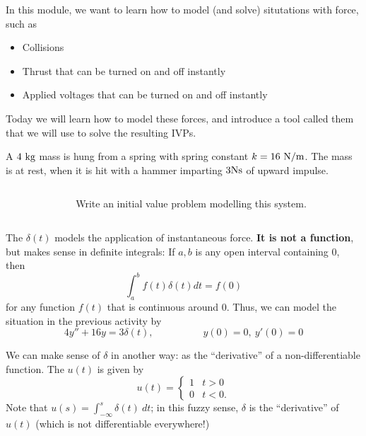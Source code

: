 \begin{applicationActivities}

\begin{observation}
In this module, we want to learn how to model (and solve) situtations with  force, such as
\begin{itemize}
	\item Collisions
	\item Thrust that can be turned on and off instantly
	\item Applied voltages that can be turned on and off instantly
\end{itemize}
\vfill
Today we will learn how to model these forces, and introduce a tool called them  that we will use to solve the resulting IVPs.
\end{observation}


\begin{activity}{5}
A \(4\ {\rm kg}\) mass is hung from a spring with spring constant \(k=16\ {\rm N/m}\).  The mass is at rest, when it is hit with a hammer imparting \(3 {\rm N s}\) of upward impulse.
\vfill
\begin{columns}
\begin{column}{0.3\textwidth}
\begin{center}
\springmass
\end{center}
\end{column}
\begin{column}{0.7\textwidth}
Write an initial value problem modelling this system.
\end{column}
\end{columns}
\end{activity}


\begin{definition}
The  \(\delta(t)\) models the application of instantaneous force.  \textbf{It is not a function}, but makes sense in definite integrals: 
\vfill
If \(a,b\) is any open interval containing \(0\), then
\[ \int _a ^b f(t)\delta(t)dt = f(0)\]
for any function \(f(t)\) that is continuous around \(0\).
\vfill
Thus, we can model the situation in the previous activity by
\[ 4y''+16y=3\delta(t), \hspace{5em} y(0)=0,\ y'(0)=0\]
\end{definition}

\begin{definition}
We can make sense of \(\delta\) in another way: as the ``derivative'' of a non-differentiable function.
\vfill
The  \(u(t)\) is given by \[u(t)=\begin{cases} 1 & t > 0 \\ 0 & t<0. \end{cases}\]
\vfill
Note that \(u(s)=\int _{-\infty} ^s  \delta(t)\ dt\); in this fuzzy sense, \(\delta\) is the ``derivative'' of \(u(t)\) (which is not differentiable everywhere!)
\end{definition}


\end{applicationActivities}
